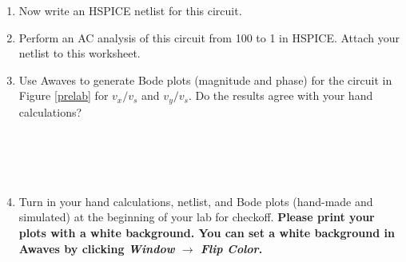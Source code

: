 \documentclass{article}
\begin{document}
\begin{enumerate}
\item Now write an HSPICE netlist for this circuit.
\item Perform an AC analysis of this circuit from \unit{100}{\kilo\hertz} to \unit{1}{\tera\hertz} in HSPICE. Attach your netlist to this worksheet.
\item Use Awaves to generate Bode plots (magnitude and phase) for the circuit in Figure \ref{prelab} for $v_x/v_s$ and $v_y/v_s$. Do the results agree with your hand calculations?  
  \\~\\~\\~\\~\\
\item Turn in your hand calculations, netlist, and Bode plots (hand-made and simulated) at the beginning of your lab for checkoff. \textbf{Please print your plots with a white background. You can set a white background in Awaves by clicking \textit{Window} $\rightarrow$ \textit{Flip Color}.}
\end{enumerate}
\end{document}
